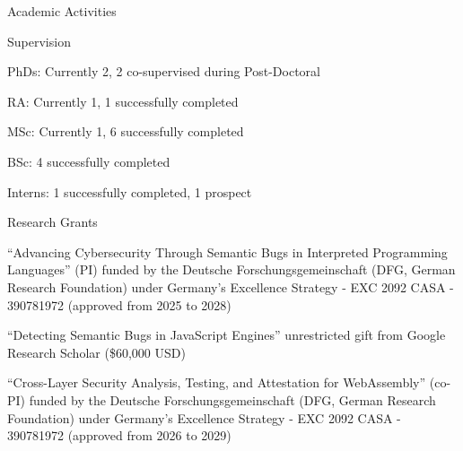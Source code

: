 \documentclass{resume} %
\begin{document}
\begin{rSection}{Academic Activities}
\begin{rSection}{Supervision}
\item PhDs: Currently 2, 2 co-supervised during Post-Doctoral
\item RA: Currently 1, 1 successfully completed
\item MSc: Currently 1, 6 successfully completed
\item BSc: 4 successfully completed
\item Interns: 1 successfully completed, 1 prospect
\end{rSection}

\begin{rSection}{Research Grants}
\item ``Advancing Cybersecurity Through Semantic Bugs in Interpreted Programming
Languages'' (PI) funded by the Deutsche Forschungsgemeinschaft (DFG, German
Research Foundation) under Germany's Excellence Strategy - EXC 2092 CASA -
390781972 (approved from 2025 to 2028)
\item ``Detecting Semantic Bugs in JavaScript Engines'' unrestricted gift from Google
Research Scholar (\$60,000 USD)
\item ``Cross-Layer Security Analysis, Testing, and Attestation for
WebAssembly'' (co-PI) funded by the Deutsche Forschungsgemeinschaft (DFG, German
Research Foundation) under Germany's Excellence Strategy - EXC 2092 CASA -
390781972 (approved from 2026 to 2029)
\end{rSection}

\end{rSection}
\end{document}
